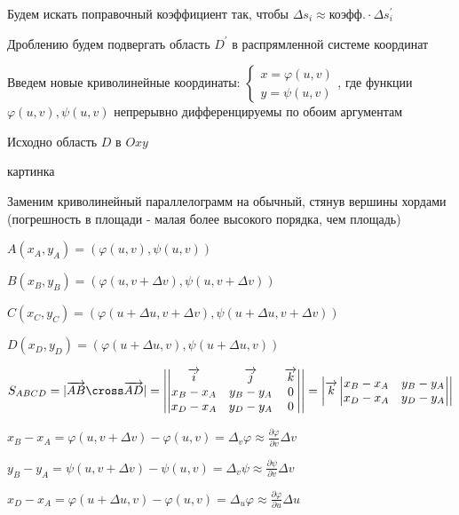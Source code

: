 \documentclass[12pt]{article}
\begin{document}
    \Nota Будем искать поправочный коэффициент так, чтобы $\Delta s_i \approx \text{коэфф.} \cdot \Delta s_i^\prime$

    Дроблению будем подвергать область $D^\prime$ в распрямленной системе координат

    Введем новые криволинейные координаты: $\begin{cases}
                                                x = \varphi(u, v) \\ y = \psi(u, v)
    \end{cases}$,
    где функции $\varphi(u, v), \psi(u, v)$ непрерывно дифференцируемы по обоим аргументам

    Исходно область $D$ в $Oxy$

    картинка

    Заменим криволинейный параллелограмм на обычный, стянув вершины хордами (погрешность в площади - малая более высокого порядка, чем площадь)

    $A(x_A, y_A) = (\varphi(u, v), \psi(u, v))$

    $B(x_B, y_B) = (\varphi(u, v+\Delta v), \psi(u, v+\Delta v))$

    $C(x_C, y_C) = (\varphi(u + \Delta u, v+\Delta v), \psi(u + \Delta u, v+\Delta v))$

    $D(x_D, y_D) = (\varphi(u + \Delta u, v), \psi(u + \Delta u, v))$

    $S_{ABCD} = |\overrightarrow{AB} \cross \overrightarrow{AD}| = \left|
    \begin{vmatrix}
        \overrightarrow{i} & \overrightarrow{j} & \overrightarrow{k} \\
        x_B - x_A          & y_B - y_A          & 0                  \\
        x_D - x_A          & y_D - y_A          & 0
    \end{vmatrix}\right| = \left| \overrightarrow{k}
    \begin{vmatrix}
        x_B - x_A & y_B - y_A \\
        x_D - x_A & y_D - y_A
    \end{vmatrix}\right|$

    $x_B - x_A = \varphi(u, v + \Delta v) - \varphi(u, v) = \Delta_v \varphi \approx \frac{\partial \varphi}{\partial v}\Delta v$

    $y_B - y_A = \psi(u, v + \Delta v) - \psi(u, v) = \Delta_v \psi \approx \frac{\partial \psi}{\partial v}\Delta v$

    $x_D - x_A = \varphi(u + \Delta u, v) - \varphi(u, v) = \Delta_u \varphi \approx \frac{\partial \varphi}{\partial u}\Delta u$
\end{document}
